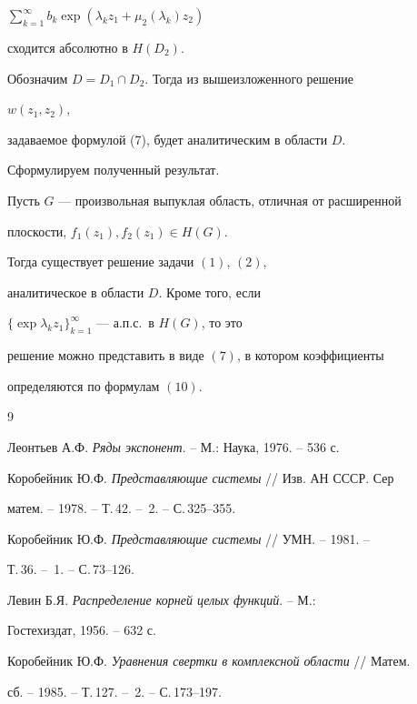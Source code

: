 $\sum\limits^\infty_{k=1}b_k\exp(\lambda_k z_1+\mu_2(\lambda_k)z_2)$ 


сходится абсолютно в $H(D_2)$. 


 


Обозначим $D=D_1\cap D_2$. Тогда из вышеизложенного решение 


$w(z_1,z_2)$, 


задаваемое формулой (7), будет аналитическим в области $D$. 


 


Сформулируем полученный результат. 


 


\begin{thmnonum} 


Пусть $G$ --- произвольная выпуклая область, отличная от расширенной 


плоскости, $f_1(z_1),f_2(z_1)\in H(G)$. 


Тогда существует решение задачи $(1)$, $(2)$, 


аналитическое в области $D$. Кроме того, если 


$\{\exp\lambda_k z_1\}^\infty_{k=1}$ --- а.п.с.~в $H(G)$, то это 


решение можно представить в виде $(7)$, в котором коэффициенты 


определяются по формулам $(10)$. 


\end{thmnonum} 


 


 


\begin{thebibliography}{9} 


 




Леонтьев А.Ф. {\em Ряды экспонент}. -- М.: Наука, 1976. -- 536 с. 




Коробейник Ю.Ф. {\em Представляющие системы} // Изв. АН СССР. Сер 


матем. -- 1978. -- Т.\,42. -- \No\,2. -- С.\,325--355. 




Коробейник Ю.Ф. {\em Представляющие системы} // УМН. -- 1981. -- 


Т.\,36. -- \No\,1. -- С.\,73--126. 




Левин Б.Я. {\em Распределение корней целых функций}. -- М.: 


Гостехиздат, 1956. -- 632 с. 




Коробейник Ю.Ф. {\em Уравнения свертки в комплексной области} // Матем. 


сб. -- 1985. -- Т.\,127. -- \No\,2. -- С.\,173--197. 


 


\end{thebibliography} 


